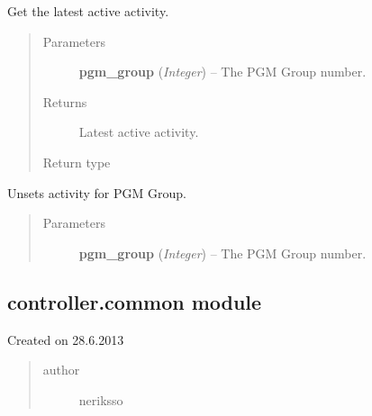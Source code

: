 \documentclass[letterpaper,10pt,english]{sphinxmanual}
\begin{document}

\begin{fulllineitems}
\label{controller:controller.activity.get_active_activity}
Get the latest active activity.
\begin{quote}\begin{description}
\item[{Parameters}] \leavevmode
\textbf{pgm\_group} (\emph{Integer}) -- The PGM Group number.

\item[{Returns}] \leavevmode
Latest active activity.

\item[{Return type}] \leavevmode
{\hyperref[models:models.Activity]{}}

\end{description}\end{quote}

\end{fulllineitems}


\begin{fulllineitems}
\label{controller:controller.activity.unset_activity}
Unsets activity for PGM Group.
\begin{quote}\begin{description}
\item[{Parameters}] \leavevmode
\textbf{pgm\_group} (\emph{Integer}) -- The PGM Group number.

\end{description}\end{quote}

\end{fulllineitems}



\subsection{controller.common module}
\label{controller:module-controller.common}\label{controller:controller-common-module}
Created on 28.6.2013
\begin{quote}\begin{description}
\item[{author}] \leavevmode
neriksso

\end{description}\end{quote}
\end{document}
